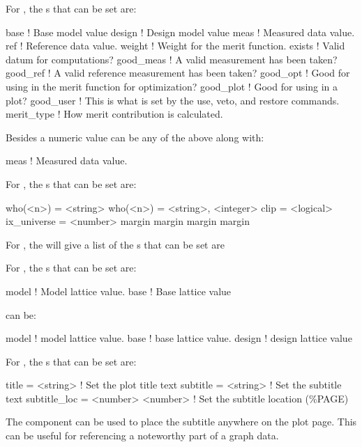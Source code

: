 For , the s that can be set are:
\begin{example}
  base        ! Base model value
  design      ! Design model value
  meas        ! Measured data value.
  ref         ! Reference data value.
  weight      ! Weight for the merit function.
  exists      ! Valid datum for computations?
  good_meas   ! A valid measurement has been taken?
  good_ref    ! A valid reference measurement has been taken?
  good_opt    ! Good for using in the merit function for optimization?
  good_plot   ! Good for using in a plot?
  good_user   ! This is what is set by the use, veto, and restore commands.
  merit_type  ! How merit contribution is calculated.
\end{example}
Besides a numeric value  can be any of the above along with:
\begin{example}
  meas        ! Measured data value.
\end{example}
\vskip 0.2in

For , the s that can be set are:
\begin{example}
  who(<n>)    = <string>
  who(<n>)    = <string>, <integer>
  clip        = <logical>
  ix_universe = <number>
  margin%
  margin%
  margin%
  margin%
\end{example}
\vskip 0.2in

For , the  will give a list of the
s that can be set are
\vskip 0.2in

For , the s that can be set are:
\begin{example}
  model      ! Model lattice value.
  base       ! Base lattice value
\end{example}
 can be:
\begin{example}
  model       ! model lattice value.
  base        ! base lattice value.
  design      ! design lattice value
\end{example}
\vskip 0.2in

For , the s that can be set are:
\begin{example}
  title        = <string>          ! Set the plot title text
  subtitle     = <string>          ! Set the subtitle text
  subtitle_loc = <number> <number> ! Set the subtitle location (\%PAGE)
\end{example}
The  component can be used to place the subtitle anywhere on
the plot page. This can be useful for referencing a noteworthy part of a graph
data.
\vskip 0.2in

